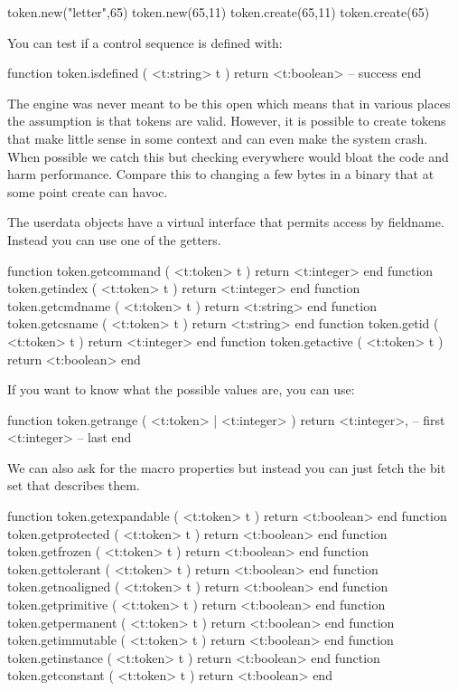 \starttyping[option=LUA]
token.new("letter",65)
token.new(65,11)
token.create(65,11)
token.create(65)
\stoptyping

You can test if a control sequence is defined with:

\starttyping[option=LUA]
function token.isdefined ( <t:string> t )
    return <t:boolean> -- success
end
\stoptyping

The engine was never meant to be this open which means that in various places the
assumption is that tokens are valid. However, it is possible to create tokens that
make little sense in some context and can even make the system crash. When
possible we catch this but checking everywhere would bloat the code and harm
performance. Compare this to changing a few bytes in a binary that at some point
create can havoc.

\stopsubsection

\startsubsection[title={Getters}]

The userdata objects have a virtual interface that permits access by fieldname.
Instead you can use one of the getters.


\starttyping[option=LUA]
function token.getcommand ( <t:token> t ) return <t:integer> end
function token.getindex   ( <t:token> t ) return <t:integer> end
function token.getcmdname ( <t:token> t ) return <t:string>  end
function token.getcsname  ( <t:token> t ) return <t:string>  end
function token.getid      ( <t:token> t ) return <t:integer> end
function token.getactive  ( <t:token> t ) return <t:boolean> end
\stoptyping

If you want to know what the possible values are, you can use:

\starttyping[option=LUA]
function token.getrange (
    <t:token> | <t:integer>
)
return
    <t:integer>, -- first
    <t:integer>  -- last
end
\stoptyping

We can also ask for the macro properties but instead you can just fetch the bit
set that describes them.

\starttyping[option=LUA]
function token.getexpandable ( <t:token> t ) return <t:boolean> end
function token.getprotected  ( <t:token> t ) return <t:boolean> end
function token.getfrozen     ( <t:token> t ) return <t:boolean> end
function token.gettolerant   ( <t:token> t ) return <t:boolean> end
function token.getnoaligned  ( <t:token> t ) return <t:boolean> end
function token.getprimitive  ( <t:token> t ) return <t:boolean> end
function token.getpermanent  ( <t:token> t ) return <t:boolean> end
function token.getimmutable  ( <t:token> t ) return <t:boolean> end
function token.getinstance   ( <t:token> t ) return <t:boolean> end
function token.getconstant   ( <t:token> t ) return <t:boolean> end
\stoptyping

